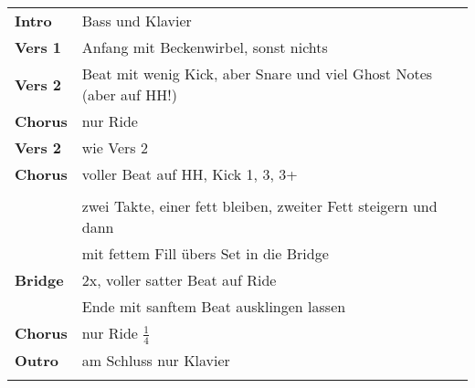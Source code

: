 
\begin{tabular}{p{1.6cm}l}
	\textbf{Intro}  & Bass und Klavier \\
	\textbf{Vers 1} & Anfang mit Beckenwirbel, sonst nichts \\
	\textbf{Vers 2} & Beat mit wenig Kick, aber Snare und viel Ghost Notes (aber auf HH!) \\
	\textbf{Chorus} & nur Ride \\
	\textbf{Vers 2} & wie Vers 2 \\
	\textbf{Chorus} & voller Beat auf HH, Kick 1, 3, 3+ \\
	                &  \\
	                & zwei Takte, einer fett bleiben, zweiter Fett steigern und dann \\
	                & mit fettem Fill übers Set in die Bridge \\
	\textbf{Bridge} & 2x, voller satter Beat auf Ride \\
	                & Ende mit sanftem Beat ausklingen lassen \\
	\textbf{Chorus} & nur Ride $\frac{1}{4}$ \\
	\textbf{Outro}  & am Schluss nur Klavier \\
	& \\
\end{tabular}